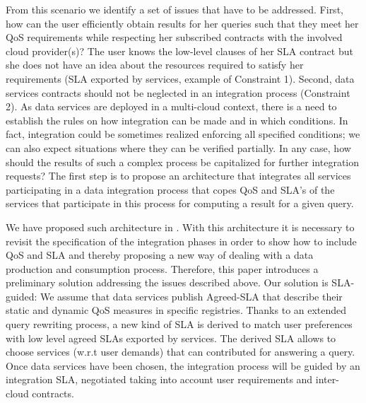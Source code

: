 

  From this scenario we identify a set of issues that have to be addressed. First, how can the user efficiently obtain  results for her queries such that they meet her QoS requirements while respecting her subscribed contracts with the involved cloud provider(s)?  The user knows the low-level clauses of her SLA contract but she does not have an idea about the resources required to satisfy her requirements (SLA exported by services, example of Constraint 1).  Second, data services contracts should not be neglected in an integration process (Constraint 2).   As data services are deployed in a multi-cloud context, there is a need to establish the rules on how integration can be made and in which conditions. In fact, integration could be sometimes realized enforcing all specified conditions; we can also expect situations where they can be verified partially. In any case, how should the results of  such a  complex process  be capitalized for further integration requests? The first step is to propose an architecture that integrates all services participating in a data integration process that copes QoS and SLA's of the services that participate in this process for computing a result for a given query. 
  
  
 We have proposed such architecture in \cite{DBLP:conf/IEEEcloud/2014}. With this architecture it is necessary to revisit the specification of the integration phases in order to show how to include QoS and SLA and thereby proposing a new way of dealing with a data production and consumption process. 
Therefore, this paper introduces a preliminary solution addressing the issues described above.  Our solution is SLA-guided: We assume that data services publish Agreed-SLA that describe their  static and dynamic QoS measures in specific registries.  Thanks to an extended query rewriting process, a new kind of SLA is derived to match user preferences with low level agreed SLAs exported by services. The derived SLA allows to choose  services (w.r.t user demands) that can contributed for answering a query. Once data services have been chosen, the integration process will be guided by an integration SLA, negotiated taking into account user requirements and inter-cloud contracts.

